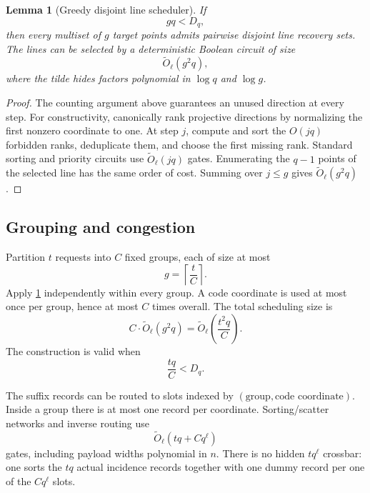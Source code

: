 \documentclass[11pt]{article}
\newtheorem{lemma}[theorem]{Lemma}
\theoremstyle{definition}
\begin{document}
\begin{lemma}[Greedy disjoint line scheduler]\label{lem:greedy-scheduler}
If
\[
  gq<D_q,
\]
then every multiset of $g$ target points admits pairwise disjoint line recovery sets.  The lines can be selected by a deterministic Boolean circuit of size
\[
 \widetilde O_\ell(g^2q),
\]
where the tilde hides factors polynomial in $\log q$ and $\log g$.
\end{lemma}

\begin{proof}
The counting argument above guarantees an unused direction at every step.  For constructivity, canonically rank projective directions by normalizing the first nonzero coordinate to one.  At step $j$, compute and sort the $O(jq)$ forbidden ranks, deduplicate them, and choose the first missing rank.  Standard sorting and priority circuits use $\widetilde O_\ell(jq)$ gates.  Enumerating the $q-1$ points of the selected line has the same order of cost.  Summing over $j\le g$ gives $\widetilde O_\ell(g^2q)$.
\end{proof}

\subsection{Grouping and congestion}

Partition $t$ requests into $C$ fixed groups, each of size at most
\[
 g=\left\lceil\frac{t}{C}\right\rceil.
\]
Apply \cref{lem:greedy-scheduler} independently within every group.  A code coordinate is used at most once per group, hence at most $C$ times overall.  The total scheduling size is
\begin{equation}\label{eq:scheduler-cost}
 C\cdot\widetilde O_\ell(g^2q)
   =\widetilde O_\ell\!\left(\frac{t^2q}{C}\right).
\end{equation}
The construction is valid when
\begin{equation}\label{eq:scheduler-condition}
 \frac{tq}{C}<D_q.
\end{equation}

The suffix records can be routed to slots indexed by
$(\text{group},\text{code coordinate})$.  Inside a group there is at most one record per coordinate.  Sorting/scatter networks and inverse routing use
\begin{equation}\label{eq:routing-cost}
 \widetilde O_\ell(tq+Cq^\ell)
\end{equation}
gates, including payload widths polynomial in $n$.  There is no hidden $tq^\ell$ crossbar: one sorts the $tq$ actual incidence records together with one dummy record per one of the $Cq^\ell$ slots.
\end{document}
